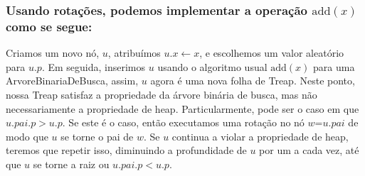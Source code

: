 \documentclass{beamer}
\begin{document}
\begin{frame}
\frametitle{Usando rotações, podemos implementar a operação \ensuremath{\ensuremath{\mathrm{add}(\ensuremath{\mathit{x}})}} como se segue:}

Criamos um novo nó, \ensuremath{\ensuremath{\ensuremath{\mathit{u}}}}, atribuímos \ensuremath{\ensuremath{\ensuremath{\mathit{u}}.\ensuremath{x}\gets \ensuremath{x}}}, e escolhemos um valor aleatório
para \ensuremath{\ensuremath{\ensuremath{\mathit{u}}.\ensuremath{\mathit{p}}}}.  Em seguida, inserimos \ensuremath{\ensuremath{\ensuremath{\mathit{u}}}} usando o algoritmo usual \ensuremath{\ensuremath{\mathrm{add}(\ensuremath{\mathit{x}})}} 
para uma ArvoreBinariaDeBusca, assim, \ensuremath{\ensuremath{\ensuremath{\mathit{u}}}} agora é uma nova folha de Treap.
Neste ponto, nossa Treap satisfaz a propriedade da árvore binária de busca,
mas não necessariamente a propriedade de heap.  Particularmente, pode ser 
o caso em que \ensuremath{\ensuremath{\ensuremath{\mathit{u}}.\ensuremath{\mathit{pai}}.\ensuremath{\mathit{p}} > \ensuremath{\mathit{u}}.\ensuremath{\mathit{p}}}}.  Se este é o caso, então executamos uma
rotação no nó \ensuremath{\ensuremath{\ensuremath{\mathit{w}}}}=\ensuremath{\ensuremath{\ensuremath{\mathit{u}}.\ensuremath{\mathit{pai}}}} de modo que \ensuremath{\ensuremath{\ensuremath{\mathit{u}}}} se torne o pai de \ensuremath{\ensuremath{\ensuremath{\mathit{w}}}}.
Se \ensuremath{\ensuremath{\ensuremath{\mathit{u}}}} continua a violar a propriedade de heap, teremos que repetir isso, 
diminuindo a profundidade de \ensuremath{\ensuremath{\ensuremath{\mathit{u}}}} por um a cada vez, até
que \ensuremath{\ensuremath{\ensuremath{\mathit{u}}}} se torne a raiz ou $\ensuremath{\ensuremath{\ensuremath{\mathit{u}}.\ensuremath{\mathit{pai}}.\ensuremath{\mathit{p}}}} < \ensuremath{\ensuremath{\ensuremath{\mathit{u}}.\ensuremath{\mathit{p}}}}$.

\end{frame}
\end{document}
